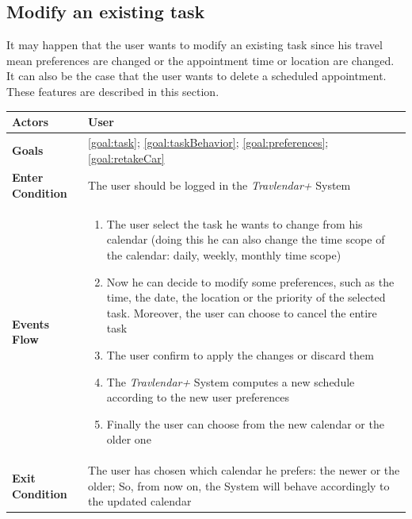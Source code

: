\subsection{Modify an existing task}

It may happen that the user wants to modify an existing task since his travel mean preferences are changed or the appointment time or location are changed. It can also be the case that the user wants to delete a scheduled appointment. These features are described in this section.

\begin{table}[H]
	\centering
    
    \begin{tabular}{|p{3.5cm}|p{10.3cm}|}
    
    \hline
    \textbf{\large{Actors}}  			& \tabitem User\\
    
    \hline
    \textbf{\large{Goals}} 				& \ref{goal:task}; \ref{goal:taskBehavior}; \ref{goal:preferences}; \ref{goal:retakeCar}\\
    
    \hline
    \textbf{\large{Enter Condition}}	& The user should be logged in the                                                        \emph{Travlendar+} System\\
    
    \hline
    \textbf{\large{Events Flow}}		& \begin{enumerate}[leftmargin=0.5cm]
                                             
                                          	\item The user select the task he wants to change from his calendar (doing this he can also change the time scope of the calendar: daily, weekly, monthly time scope)
                                          	\item Now he can decide to modify some preferences, such as the time, the date, the location or the priority of the selected task. Moreover, the user can choose to cancel the entire task
                                          	\item The user confirm to apply the changes or discard them
                                          	\item The \emph{Travlendar+} System computes a new schedule according to the new user preferences
                                          	\item Finally the user can choose from the new calendar or the older one
                                          \end{enumerate}
    										\\
    \hline
    \textbf{\large{Exit Condition}} 	& The user has chosen which calendar he prefers:                                          the newer or the older; So, from now on, the System will behave accordingly to the updated calendar\\
    

\end{tabular}
\end{table}
